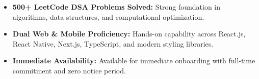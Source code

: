 \documentclass[a4paper,10pt]{article}
\begin{document}
\begin{itemize}

    \item \textbf{500+ LeetCode DSA Problems Solved:} Strong foundation in algorithms, data structures, and computational optimization.

    \item \textbf{Dual Web \& Mobile Proficiency:} Hands-on capability across React.js, React Native, Next.js, TypeScript, and modern styling libraries.

    \item \textbf{Immediate Availability:} Available for immediate onboarding with full-time commitment and zero notice period.

\end{itemize}

\end{document}
